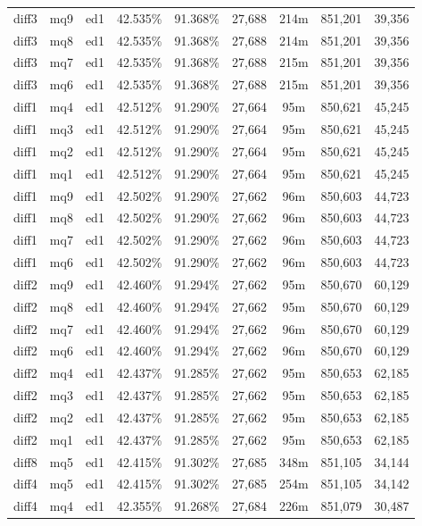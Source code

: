 \begin{landscape}
\begin{longtable}{|c|c|c||c|c||c|c|c|c|}
diff3 & mq9 & ed1 & 42.535\% & 91.368\% & 27,688 & 214m & 851,201 & 39,356 \\
diff3 & mq8 & ed1 & 42.535\% & 91.368\% & 27,688 & 214m & 851,201 & 39,356 \\
diff3 & mq7 & ed1 & 42.535\% & 91.368\% & 27,688 & 215m & 851,201 & 39,356 \\
diff3 & mq6 & ed1 & 42.535\% & 91.368\% & 27,688 & 215m & 851,201 & 39,356 \\
diff1 & mq4 & ed1 & 42.512\% & 91.290\% & 27,664 & 95m & 850,621 & 45,245 \\
diff1 & mq3 & ed1 & 42.512\% & 91.290\% & 27,664 & 95m & 850,621 & 45,245 \\
diff1 & mq2 & ed1 & 42.512\% & 91.290\% & 27,664 & 95m & 850,621 & 45,245 \\
diff1 & mq1 & ed1 & 42.512\% & 91.290\% & 27,664 & 95m & 850,621 & 45,245 \\
diff1 & mq9 & ed1 & 42.502\% & 91.290\% & 27,662 & 96m & 850,603 & 44,723 \\
diff1 & mq8 & ed1 & 42.502\% & 91.290\% & 27,662 & 96m & 850,603 & 44,723 \\
diff1 & mq7 & ed1 & 42.502\% & 91.290\% & 27,662 & 96m & 850,603 & 44,723 \\
diff1 & mq6 & ed1 & 42.502\% & 91.290\% & 27,662 & 96m & 850,603 & 44,723 \\
diff2 & mq9 & ed1 & 42.460\% & 91.294\% & 27,662 & 95m & 850,670 & 60,129 \\
diff2 & mq8 & ed1 & 42.460\% & 91.294\% & 27,662 & 95m & 850,670 & 60,129 \\
diff2 & mq7 & ed1 & 42.460\% & 91.294\% & 27,662 & 96m & 850,670 & 60,129 \\
diff2 & mq6 & ed1 & 42.460\% & 91.294\% & 27,662 & 96m & 850,670 & 60,129 \\
diff2 & mq4 & ed1 & 42.437\% & 91.285\% & 27,662 & 95m & 850,653 & 62,185 \\
diff2 & mq3 & ed1 & 42.437\% & 91.285\% & 27,662 & 95m & 850,653 & 62,185 \\
diff2 & mq2 & ed1 & 42.437\% & 91.285\% & 27,662 & 95m & 850,653 & 62,185 \\
diff2 & mq1 & ed1 & 42.437\% & 91.285\% & 27,662 & 95m & 850,653 & 62,185 \\
diff8 & mq5 & ed1 & 42.415\% & 91.302\% & 27,685 & 348m & 851,105 & 34,144 \\
diff4 & mq5 & ed1 & 42.415\% & 91.302\% & 27,685 & 254m & 851,105 & 34,142 \\
diff4 & mq4 & ed1 & 42.355\% & 91.268\% & 27,684 & 226m & 851,079 & 30,487 \\

\end{longtable}
\end{landscape}

